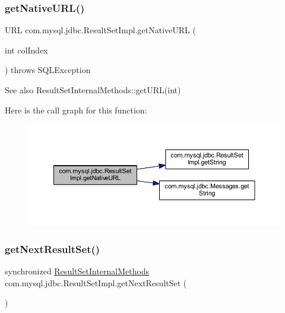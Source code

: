 \subsubsection{\texorpdfstring{get\+Native\+U\+R\+L()}{getNativeURL()}}
{\footnotesize\ttfamily U\+RL com.\+mysql.\+jdbc.\+Result\+Set\+Impl.\+get\+Native\+U\+RL (\begin{DoxyParamCaption}\item[{int}]{col\+Index }\end{DoxyParamCaption}) throws S\+Q\+L\+Exception\hspace{0.3cm}{\ttfamily [protected]}}

\begin{DoxySeeAlso}{See also}
Result\+Set\+Internal\+Methods\+::get\+U\+R\+L(int) 
\end{DoxySeeAlso}
Here is the call graph for this function\+:
\nopagebreak
\begin{figure}[H]
\begin{center}
\leavevmode
\includegraphics[width=350pt]{classcom_1_1mysql_1_1jdbc_1_1_result_set_impl_a71324cfb1aabc0ba2a5a6ba0ddb165c5_cgraph}
\end{center}
\end{figure}
\mbox{\label{classcom_1_1mysql_1_1jdbc_1_1_result_set_impl_a95c75be5755be8089539b6e62059ff5d}} 
\subsubsection{\texorpdfstring{get\+Next\+Result\+Set()}{getNextResultSet()}}
{\footnotesize\ttfamily synchronized \mbox{\hyperlink{interfacecom_1_1mysql_1_1jdbc_1_1_result_set_internal_methods}{Result\+Set\+Internal\+Methods}} com.\+mysql.\+jdbc.\+Result\+Set\+Impl.\+get\+Next\+Result\+Set (\begin{DoxyParamCaption}{ }\end{DoxyParamCaption})}

